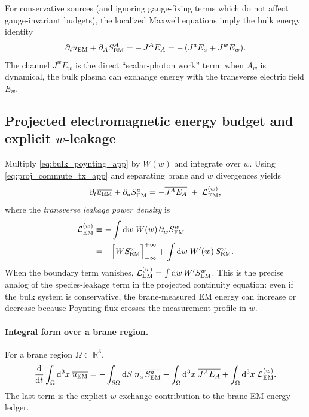 \documentclass[11pt]{article}
\begin{document}
For conservative sources (and ignoring gauge-fixing terms which do not affect gauge-invariant
budgets), the localized Maxwell equations imply the bulk energy identity
\begin{equation}
\partial_t u_{\rm EM}
+
\partial_A S_{\rm EM}^A
=
-\,J^A E_A
=
-\,(J^aE_a + J^wE_w).
\label{eq:bulk_poynting_app}
\end{equation}
The channel \(J^wE_w\) is the direct ``scalar-photon work'' term: when \(A_w\) is dynamical,
the bulk plasma can exchange energy with the transverse electric field \(E_w\).

\subsection{Projected electromagnetic energy budget and explicit \texorpdfstring{\(w\)}{w}-leakage}
\label{app:proj_energy_budget}

Multiply \eqref{eq:bulk_poynting_app} by \(W(w)\) and integrate over \(w\). Using
\eqref{eq:proj_commute_tx_app} and separating brane and \(w\) divergences yields
\begin{equation}
\partial_t \overline{u_{\rm EM}}
+
\partial_a \overline{S_{\rm EM}^a}
=
-\overline{J^A E_A}
\;+\;
\mathcal{L}_{\rm EM}^{(w)},
\label{eq:proj_energy_local_app}
\end{equation}
where the \emph{transverse leakage power density} is
\begin{align}
\mathcal{L}_{\rm EM}^{(w)}
&\equiv
-\int\dd w\;W(w)\,\partial_w S_{\rm EM}^w
\nonumber\\
&=
-\Big[W S_{\rm EM}^w\Big]_{-\infty}^{+\infty}
+
\int\dd w\;W'(w)\,S_{\rm EM}^w.
\label{eq:energy_leak_term_app}
\end{align}
When the boundary term vanishes, \(\mathcal{L}_{\rm EM}^{(w)}=\int \dd w\,W' S_{\rm EM}^w\).
This is the precise analog of the species-leakage term in the projected continuity equation:
even if the bulk system is conservative, the brane-measured EM energy can increase or decrease
because Poynting flux crosses the measurement profile in \(w\).

\paragraph{Integral form over a brane region.}
For a brane region \(\Omega\subset\mathbb{R}^3\),
\begin{equation}
\frac{\dd}{\dd t}\int_{\Omega}\dd^3x\;\overline{u_{\rm EM}}
=
-\int_{\partial\Omega}\dd S\;n_a\,\overline{S_{\rm EM}^a}
-\int_{\Omega}\dd^3x\;\overline{J^A E_A}
+\int_{\Omega}\dd^3x\;\mathcal{L}_{\rm EM}^{(w)}.
\label{eq:energy_integral_brane_app}
\end{equation}
The last term is the explicit \(w\)-exchange contribution to the brane EM energy ledger.
\end{document}
